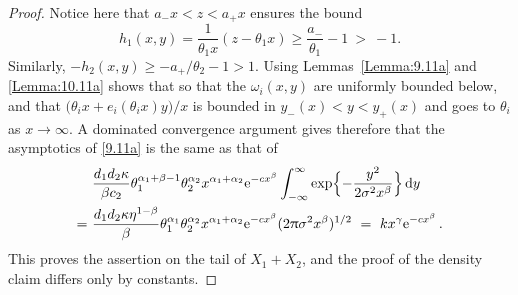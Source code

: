\begin{proof}
Notice here that $a_-x<z<a_+x$ ensures the bound
\[ h_1(x,y)=\frac{1}{\theta_1x}(z-\theta_1x)\ge
\frac{a_-}{\theta_1}-1\ > \ -1.
\]
Similarly, $-h_2(x,y)\ge -a_+/\theta_2-1>1$. Using Lemmas~\ref{Lemma:9.11a} and \ref{Lemma:10.11a} shows that
so that the $\omega_i(x,y)$ are uniformly bounded below, and that
$\bigl(\theta_ix+e_i(\theta_ix)y\bigr)/x$ is bounded in $y_-(x)<y<y_+(x)$ and goes to $\theta_i$ as $x\to\infty$. A dominated convergence argument gives therefore that the asymptotics of \eqref{9.11a} is the same as that of
\begin{align*}& \frac{d_1d_2\kappa }{\beta c_2}\theta_1^{\alpha_1+\beta-1}\theta_2^{\alpha_2}x^{\alpha_1+\alpha_2}\e^{-cx^\beta}
 \int_{-\infty}^\infty \exp\Bigl\{-\frac{y^2}{2\sigma^2x^\beta}\Bigr\}\,\dd y\\ =\ &
 \frac{d_1d_2\kappa\eta^{1-\beta} }{\beta }\theta_1^{\alpha_1}\theta_2^{\alpha_2}x^{\alpha_1+\alpha_2}\e^{-cx^\beta}(2\pii \sigma^2 x^{\beta})^{1/2}\ =\
  k x^{\gamma} \e^{-cx^\beta} \,.
\end{align*}
This proves the assertion on the tail of $X_1+X_2$, and the proof of the density claim differs only by constants.
\end{proof}

